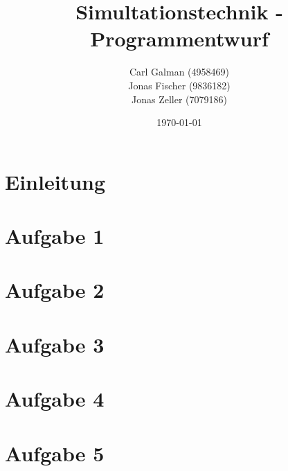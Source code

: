 \documentclass[12pt, a4paper]{article}
\title{Simultationstechnik -\\
    Programmentwurf}
\author{Carl Galman (4958469) \\
    Jonas Fischer (9836182) \\
    Jonas Zeller (7079186) }
\date{\today}
\begin{document}
    \maketitle


    \newpage

    \tableofcontents

    \newpage

    \listoffigures

    \newpage

    \section*{Einleitung }
    
    \newpage
    \section{Aufgabe 1}
    
    \newpage
    \section{Aufgabe 2}
    
    \newpage
    \section{Aufgabe 3}
    
    \newpage
    \section{Aufgabe 4}
    
    \newpage
    \section{Aufgabe 5}
    
\end{document}
